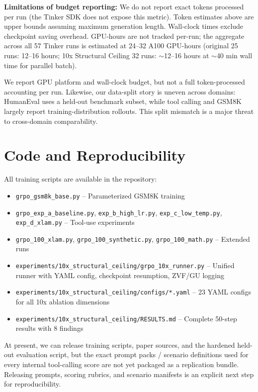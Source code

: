 \documentclass{article}
\begin{document}
\textbf{Limitations of budget reporting:} We do not report exact tokens processed per run (the Tinker SDK does not expose this metric). Token estimates above are upper bounds assuming maximum generation length. Wall-clock times exclude checkpoint saving overhead. GPU-hours are not tracked per-run; the aggregate across all 57 Tinker runs is estimated at 24--32 A100 GPU-hours (original 25 runs: 12--16 hours; 10x Structural Ceiling 32 runs: $\sim$12--16 hours at $\sim$40 min wall time for parallel batch).

We report GPU platform and wall-clock budget, but not a full token-processed accounting per run. Likewise, our data-split story is uneven across domains: HumanEval uses a held-out benchmark subset, while tool calling and GSM8K largely report training-distribution rollouts. This split mismatch is a major threat to cross-domain comparability.

\section{Code and Reproducibility}

All training scripts are available in the repository:
\begin{itemize}
    \item \texttt{grpo\_gsm8k\_base.py} -- Parameterized GSM8K training
    \item \texttt{grpo\_exp\_a\_baseline.py}, \texttt{exp\_b\_high\_lr.py}, \texttt{exp\_c\_low\_temp.py}, \texttt{exp\_d\_xlam.py} -- Tool-use experiments
    \item \texttt{grpo\_100\_xlam.py}, \texttt{grpo\_100\_synthetic.py}, \texttt{grpo\_100\_math.py} -- Extended runs
    \item \texttt{experiments/10x\_structural\_ceiling/grpo\_10x\_runner.py} -- Unified runner with YAML config, checkpoint resumption, ZVF/GU logging
    \item \texttt{experiments/10x\_structural\_ceiling/configs/*.yaml} -- 23 YAML configs for all 10x ablation dimensions
    \item \texttt{experiments/10x\_structural\_ceiling/RESULTS.md} -- Complete 50-step results with 8 findings
\end{itemize}

At present, we can release training scripts, paper sources, and the hardened held-out evaluation script, but the exact prompt packs / scenario definitions used for every internal tool-calling score are not yet packaged as a replication bundle. Releasing prompts, scoring rubrics, and scenario manifests is an explicit next step for reproducibility.
\end{document}
